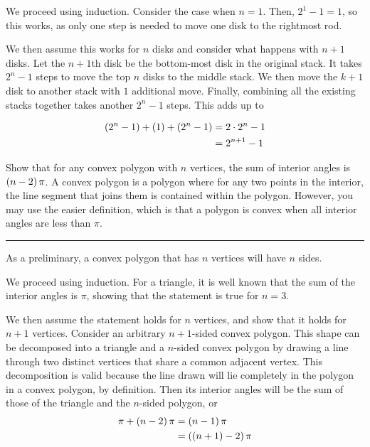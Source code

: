 \documentclass{article}
\begin{document}
We proceed using induction.
Consider the case when $n=1$.
Then, $2^1 - 1 = 1$, so this works, as only one step is needed to move one disk to the rightmost rod.

We then assume this works for $n$ disks and consider what happens with $n+1$ disks.
Let the $n+1$th disk be the bottom-most disk in the original stack.
It takes $2^n - 1$ steps to move the top $n$ disks to the middle stack.
We then move the $k+1$ disk to another stack with $1$ additional move.
Finally, combining all the existing stacks together takes another $2^n - 1$ steps.
This adds up to

\begin{align*}
  \left (2^n - 1 \right) + \left (1 \right) + \left (2^n - 1 \right) &= 2 \cdot 2^n - 1 \\
                                             &= 2^{n+1} - 1
\end{align*}

\problem
Show that for any convex polygon with $n$ vertices, the sum of interior angles is $\left (n-2 \right)\pi$. A convex polygon is a polygon where for any two points in the interior, the line segment that joins them is contained within the polygon. However, you may use the easier definition, which is that a polygon is convex when all interior angles are less than $\pi$.
\hrule

As a preliminary, a convex polygon that has $n$ vertices will have $n$ sides.

We proceed using induction.
For a triangle, it is well known that the sum of the interior angles is $\pi$, showing that the statement is true for $n=3$.

We then assume the statement holds for $n$ vertices, and show that it holds for $n+1$ vertices.
Consider an arbitrary $n+1$-sided convex polygon.
This shape can be decomposed into a triangle and a $n$-sided convex polygon by drawing a line through two distinct vertices that share a common adjacent vertex.
This decomposition is valid because the line drawn will lie completely in the polygon in a convex polygon, by definition.
Then its interior angles will be the sum of those of the triangle and the $n$-sided polygon, or
\begin{align*}
  \pi + \left (n-2 \right) \pi &= \left (n-1 \right) \pi \\
                       &= \left (\left (n+1 \right)-2 \right) \pi \\
\end{align*}

\problem{}
\end{document}
